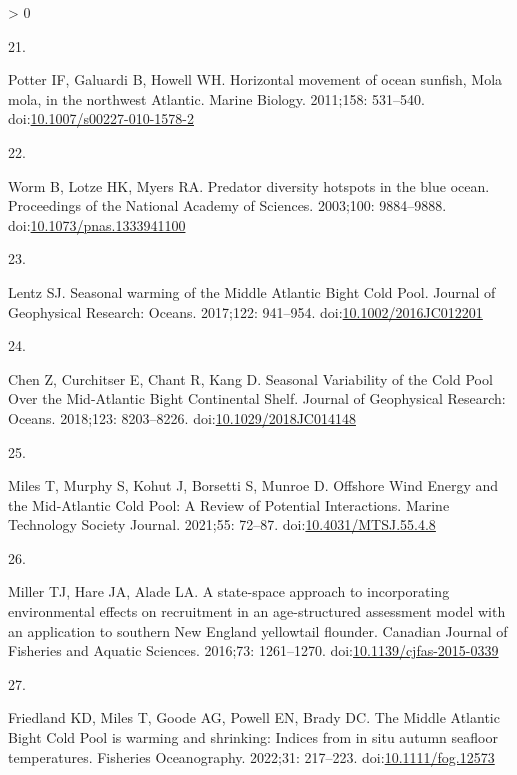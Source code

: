 \documentclass[
  10pt,
]{article}
\newlength{\cslhangindent}
\newlength{\csllabelwidth}
\newenvironment{CSLReferences}[2] %
 {%
  \setlength{\parindent}{0pt}
  \ifodd #1 \everypar{\setlength{\hangindent}{\cslhangindent}}\ignorespaces\fi
  \ifnum #2 > 0
  \setlength{\parskip}{#2\baselineskip}
  \fi
 }%
 {}
\newcommand{\CSLLeftMargin}[1]{\parbox[t]{\csllabelwidth}{#1}}
\newcommand{\CSLRightInline}[1]{\parbox[t]{\linewidth - \csllabelwidth}{#1}\break}
\begin{document}
\begin{CSLReferences}{0}{0}
\leavevmode\hypertarget{ref-potter_horizontal_2011}{}%
\CSLLeftMargin{21. }
\CSLRightInline{Potter IF, Galuardi B, Howell WH. Horizontal movement of
ocean sunfish, {Mola} mola, in the northwest {Atlantic}. Marine Biology.
2011;158: 531--540.
doi:\href{https://doi.org/10.1007/s00227-010-1578-2}{10.1007/s00227-010-1578-2}}

\leavevmode\hypertarget{ref-worm_predator_2003}{}%
\CSLLeftMargin{22. }
\CSLRightInline{Worm B, Lotze HK, Myers RA. Predator diversity hotspots
in the blue ocean. Proceedings of the National Academy of Sciences.
2003;100: 9884--9888.
doi:\href{https://doi.org/10.1073/pnas.1333941100}{10.1073/pnas.1333941100}}

\leavevmode\hypertarget{ref-lentz_seasonal_2017}{}%
\CSLLeftMargin{23. }
\CSLRightInline{Lentz SJ. Seasonal warming of the {Middle} {Atlantic}
{Bight} {Cold} {Pool}. Journal of Geophysical Research: Oceans.
2017;122: 941--954.
doi:\href{https://doi.org/10.1002/2016JC012201}{10.1002/2016JC012201}}

\leavevmode\hypertarget{ref-chen_seasonal_2018}{}%
\CSLLeftMargin{24. }
\CSLRightInline{Chen Z, Curchitser E, Chant R, Kang D. Seasonal
{Variability} of the {Cold} {Pool} {Over} the {Mid}-{Atlantic} {Bight}
{Continental} {Shelf}. Journal of Geophysical Research: Oceans.
2018;123: 8203--8226.
doi:\href{https://doi.org/10.1029/2018JC014148}{10.1029/2018JC014148}}

\leavevmode\hypertarget{ref-miles_offshore_2021}{}%
\CSLLeftMargin{25. }
\CSLRightInline{Miles T, Murphy S, Kohut J, Borsetti S, Munroe D.
Offshore {Wind} {Energy} and the {Mid}-{Atlantic} {Cold} {Pool}: {A}
{Review} of {Potential} {Interactions}. Marine Technology Society
Journal. 2021;55: 72--87.
doi:\href{https://doi.org/10.4031/MTSJ.55.4.8}{10.4031/MTSJ.55.4.8}}

\leavevmode\hypertarget{ref-miller_state-space_2016}{}%
\CSLLeftMargin{26. }
\CSLRightInline{Miller TJ, Hare JA, Alade LA. A state-space approach to
incorporating environmental effects on recruitment in an age-structured
assessment model with an application to southern {New} {England}
yellowtail flounder. Canadian Journal of Fisheries and Aquatic Sciences.
2016;73: 1261--1270.
doi:\href{https://doi.org/10.1139/cjfas-2015-0339}{10.1139/cjfas-2015-0339}}

\leavevmode\hypertarget{ref-friedland_middle_2022}{}%
\CSLLeftMargin{27. }
\CSLRightInline{Friedland KD, Miles T, Goode AG, Powell EN, Brady DC.
The {Middle} {Atlantic} {Bight} {Cold} {Pool} is warming and shrinking:
{Indices} from in situ autumn seafloor temperatures. Fisheries
Oceanography. 2022;31: 217--223.
doi:\href{https://doi.org/10.1111/fog.12573}{10.1111/fog.12573}}


\end{CSLReferences}
\end{document}
